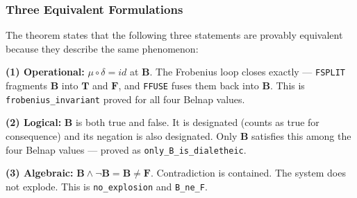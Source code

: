 \documentclass[10pt,a4paper]{article}
\begin{document}
\subsubsection{Three Equivalent Formulations}

The theorem states that the following three statements are provably equivalent because they describe the same phenomenon:

\textbf{(1) Operational:} $\mu\circ\delta = id$ at $\mathbf{B}$. The Frobenius loop closes exactly --- \texttt{FSPLIT}  fragments $\mathbf{B}$ into $\mathbf{T}$ and $\mathbf{F}$, and \texttt{FFUSE} fuses them back into $\mathbf{B}$. This is \texttt{frobenius\_\allowbreak invariant} proved for all four Belnap values.

\textbf{(2) Logical:} $\mathbf{B}$ is both true and false. It is designated (counts as true for consequence) and its negation is also designated. Only $\mathbf{B}$ satisfies this among the four Belnap values --- proved as \texttt{only\_\allowbreak B\_\allowbreak is\_\allowbreak dialetheic}.

\textbf{(3) Algebraic:} $\mathbf{B} \land \neg \mathbf{B} = \mathbf{B} \neq \mathbf{F}$. Contradiction is contained. The system does not explode. This is \texttt{no\_\allowbreak explosion} and \texttt{B\_\allowbreak ne\_\allowbreak F}.
\end{document}
